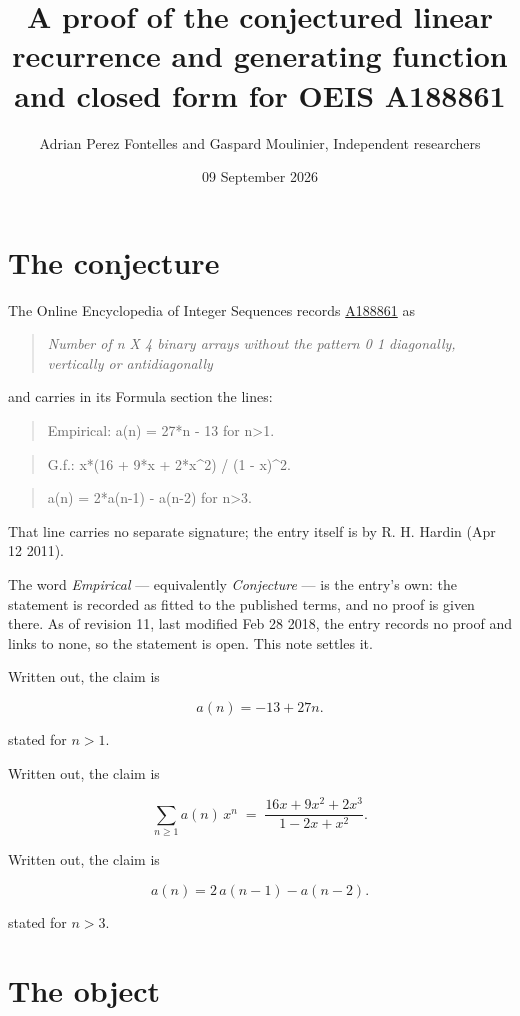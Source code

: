 \documentclass[11pt]{article}
\title{A proof of the conjectured linear recurrence and generating function and closed form for OEIS A188861}
\author{Adrian Perez Fontelles and Gaspard Moulinier, Independent researchers}
\date{09 September 2026}
\theoremstyle{definition}
\begin{document}
\maketitle
\section{The conjecture}

The Online Encyclopedia of Integer Sequences records \href{https://oeis.org/A188861}{A188861} as

\begin{quote}\itshape Number of n X 4 binary arrays without the pattern 0 1 diagonally, vertically or antidiagonally\end{quote}

and carries in its Formula section the lines:

\begin{quote}\ttfamily Empirical: a(n) = 27*n - 13 for n>1.\end{quote}

\begin{quote}\ttfamily G.f.: x*(16 + 9*x + 2*x\textasciicircum{}2) / (1 - x)\textasciicircum{}2.\end{quote}

\begin{quote}\ttfamily a(n) = 2*a(n-1) - a(n-2) for n>3.\end{quote}

That line carries no separate signature; the entry itself is by R. H. Hardin (Apr 12 2011).

The word {\itshape Empirical} --- equivalently {\itshape Conjecture} --- is the entry's own: the statement is recorded as fitted to the published terms, and no proof is given there. As of revision 11, last modified Feb 28 2018, the entry records no proof and links to none, so the statement is open. This note settles it.

Written out, the claim is

\[a(n) = -13 + 27n.\]

stated for $n > 1$.

Written out, the claim is

\[\sum_{n \ge 1} a(n)\,x^n \;=\; \frac{16x + 9x^{2} + 2x^{3}}{1 - 2x + x^{2}}.\]

Written out, the claim is

\[a(n) = 2\,a(n-1) - a(n-2).\]

stated for $n > 3$.

\section{The object}
\end{document}
